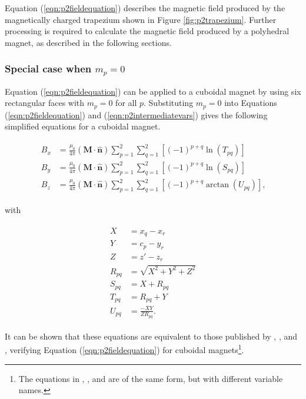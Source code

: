 Equation (\ref{eqn:p2fieldequation}) describes the magnetic field produced by the magnetically charged trapezium shown in Figure \ref{fig:p2trapezium}. Further processing is required to calculate the magnetic field produced by a polyhedral magnet, as described in the following sections.

\subsubsection{Special case when \(m_p = 0\)}

Equation (\ref{eqn:p2fieldequation}) can be applied to a cuboidal magnet by using six rectangular faces with \(m_p = 0\) for all \(p\). Substituting \(m_p = 0\) into Equations (\ref{eqn:p2fieldequation}) and (\ref{eqn:p2intermediatevars}) gives the following simplified equations for a cuboidal magnet.

\begin{align}\label{eqn:p2cuboidequation}
\begin{split}
B_x &= \frac{\mu_0}{4\pi} \left(\mathbf{M} \cdot \hat{\mathbf{n}}\right) \sum_{p=1}^2 \sum_{q=1}^2 \left[ \left( -1 \right) ^{p+q} \ln \left( T_{pq} \right) \right] \\
B_y &= \frac{\mu_0}{4\pi} \left(\mathbf{M} \cdot \hat{\mathbf{n}}\right) \sum_{p=1}^2 \sum_{q=1}^2 \left[ \left( -1 \right) ^{p+q} \ln \left( S_{\!pq} \right) \right] \\
B_z &= \frac{\mu_0}{4\pi} \left(\mathbf{M} \cdot \hat{\mathbf{n}}\right) \sum_{p=1}^2 \sum_{q=1}^2 \left[ \left( -1 \right) ^{p+q} \arctan \left( U_{pq} \right) \right] \text{,}
\end{split}
\end{align}

\noindent with

\begin{align}\label{eqn:p2cuboidvars}
\begin{split}
X &= x_q - x_r \\
Y &= c_p - y_r \\
Z &= z' - z_r \\
R_{pq} &= \sqrt{X^2 + Y^2 + Z^2} \\
S_{\!pq} &= X + R_{pq} \\
T_{pq} &= R_{pq} + Y \\
U_{pq} &= \frac{-XY}{ZR_{pq}} \text{.}
\end{split}
\end{align}

It can be shown that these equations are equivalent to those published by \textcite{Akoun1984}, \textcite{Bancel1999}, and \textcite{Ravaud2009}, verifying Equation (\ref{eqn:p2fieldequation}) for cuboidal magnets\footnote{The equations in \cite{Akoun1984}, \cite{Bancel1999}, and \cite{Ravaud2009} are of the same form, but with different variable names.}.

